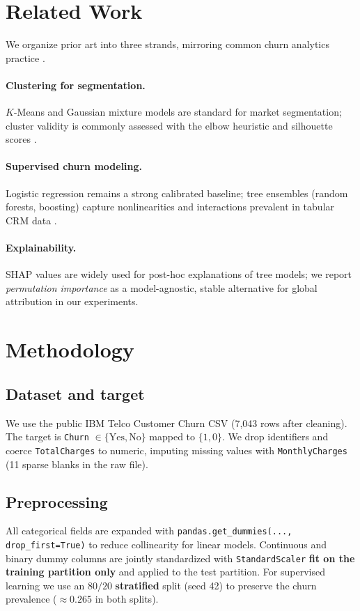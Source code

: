 \documentclass[11pt]{article}
\begin{document}
\section{Related Work}
We organize prior art into three strands, mirroring common churn analytics practice \citep{verbeke2012, idris2012, lundberg2017}.
\paragraph{Clustering for segmentation.} $K$-Means and Gaussian mixture models are standard for market segmentation; cluster validity is commonly assessed with the elbow heuristic and silhouette scores \citep{rousseeuw1987}.
\paragraph{Supervised churn modeling.} Logistic regression remains a strong calibrated baseline; tree ensembles (random forests, boosting) capture nonlinearities and interactions prevalent in tabular CRM data \citep{idris2012}.
\paragraph{Explainability.} SHAP values \citep{lundberg2017} are widely used for post-hoc explanations of tree models; we report \emph{permutation importance} \citep{breiman2001} as a model-agnostic, stable alternative for global attribution in our experiments.

\section{Methodology}
\subsection{Dataset and target}
We use the public IBM Telco Customer Churn CSV (7{,}043 rows after cleaning). The target is \texttt{Churn} $\in\{\text{Yes},\text{No}\}$ mapped to $\{1,0\}$. We drop identifiers and coerce \texttt{TotalCharges} to numeric, imputing missing values with \texttt{MonthlyCharges} (11 sparse blanks in the raw file).

\subsection{Preprocessing}
All categorical fields are expanded with \texttt{pandas.get\_dummies(..., drop\_first=True)} to reduce collinearity for linear models. Continuous and binary dummy columns are jointly standardized with \texttt{StandardScaler} \textbf{fit on the training partition only} and applied to the test partition. For supervised learning we use an $80/20$ \textbf{stratified} split (seed 42) to preserve the churn prevalence ($\approx 0.265$ in both splits).
\end{document}
